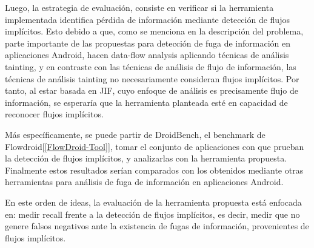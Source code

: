 Luego, la estrategia de evaluación, consiste en verificar si la herramienta
implementada identifica pérdida de información mediante detección de flujos
implícitos. Esto debido a que, como se menciona en la descripción del problema,
parte importante de las propuestas para detección de fuga de información en
aplicaciones Android, hacen data-flow analysis aplicando técnicas de análisis
tainting, y en contraste con las técnicas de análisis de flujo de información,
las técnicas de análisis tainting no necesariamente consideran flujos
implícitos. Por tanto, al estar basada en JIF, cuyo enfoque de análisis es
precisamente flujo de información, se esperaría que la herramienta planteada
esté en capacidad de reconocer flujos implícitos.


Más específicamente, se puede partir de DroidBench\cite{DroidBenchBenchmarks},
el benchmark de Flowdroid[\ref{FlowDroid-Tool}], tomar el conjunto de
aplicaciones con que prueban la detección de flujos implícitos, y analizarlas
con la herramienta propuesta.\newline
Finalmente estos resultados serían
comparados con los obtenidos mediante otras herramientas para análisis de fuga
de información en aplicaciones Android.\newline

En este orden de ideas, la evaluación de la herramienta propuesta está enfocada
en: medir recall frente a la detección de flujos implícitos, es decir, medir que
no genere falsos negativos ante la existencia de fugas de información,
provenientes de flujos implícitos.\newline







